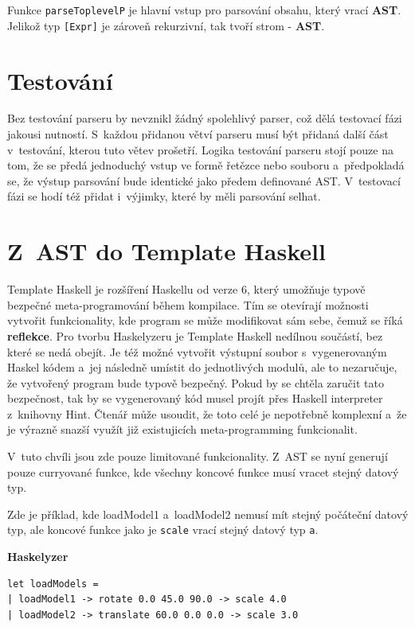 \documentclass[male, czech]{kithesis}
\newcommand{\haskellInline}[1]{\colorbox{gray!10}{\texttt{#1}}}
\begin{document}
Funkce \haskellInline{parseToplevelP} je hlavní vstup pro parsování obsahu,
který vrací \textbf{AST}. 
Jelikož typ \haskellInline{[Expr]} je zároveň rekurzivní,
tak tvoří strom - \textbf{AST}.

\section{Testování}

Bez testování parseru by nevznikl žádný spolehlivý parser, 
což dělá testovací fázi jakousi nutností.
S~každou přidanou větví parseru musí být přidaná další část v~testování,
kterou tuto větev prošetří. 
Logika testování parseru stojí pouze na tom,
že se předá jednoduchý vstup ve formě řetězce nebo souboru
a~předpokladá se, 
že výstup parsování bude identické jako předem definované AST.
V~testovací fázi se hodí též přidat i~výjimky,
které by měli parsování selhat.

\section{Z~AST do Template Haskell}
Template Haskell je rozšíření Haskellu od verze 6, 
který umožňuje typově bezpečné meta-programování během kompilace.
Tím se otevírají možnosti vytvořit funkcionality, 
kde program se může modifikovat sám sebe, 
čemuž se říká \textbf{reflekce}.
Pro tvorbu Haskelyzeru je Template Haskell nedílnou součástí,
bez které se nedá obejít.
Je též možné vytvořit výstupní soubor s~vygenerovaným Haskel kódem
a~jej následně umístit do jednotlivých modulů,
ale to nezaručuje, 
že vytvořený program bude typově bezpečný.
Pokud by se chtěla zaručit tato bezpečnost,
tak by se vygenerovaný kód musel projít přes 
Haskell interpreter z~knihovny Hint.
Čtenář může usoudit, 
že toto celé je nepotřebně komplexní
a~že je výrazně snazší využít již existujicích meta-programming funkcionalit. 

V~tuto chvíli jsou zde pouze limitované funkcionality.
Z~AST se nyní generují pouze curryované funkce,
kde všechny koncové funkce musí vracet stejný datový typ.

Zde je příklad, 
kde loadModel1
a~loadModel2 nemusí mít stejný počáteční datový typ, 
ale koncové funkce jako je \haskellInline{scale} 
vrací stejný datový typ \haskellInline{a}.

\textbf{Haskelyzer}
\begin{verbatim}
let loadModels =
| loadModel1 -> rotate 0.0 45.0 90.0 -> scale 4.0
| loadModel2 -> translate 60.0 0.0 0.0 -> scale 3.0
\end{verbatim}
\end{document}
